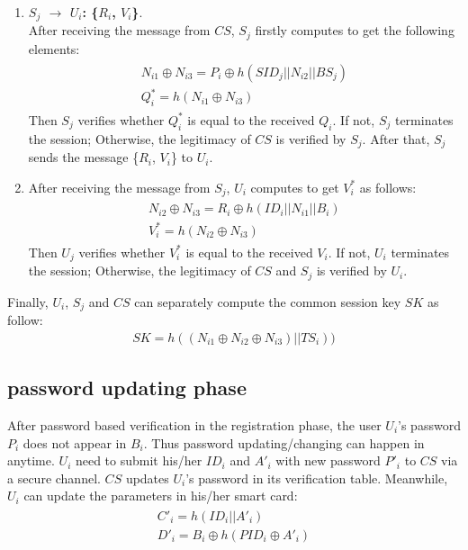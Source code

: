 \documentclass[preprint,12pt]{elsarticle}
\begin{document}
\begin{enumerate}[Step 1:]
\item \textbf{$S_j$ $\rightarrow$ $U_i$: \{$R_i$, $V_i$\}}.\\
After receiving the message from $CS$, $S_j$ firstly computes to get the following elements:
\begin{eqnarray}
\left.\begin{array}{l}
N_{i1}\oplus N_{i3}=P_i \oplus h(SID_j||N_{i2}||BS_j)\\
Q^*_i=h(N_{i1}\oplus N_{i3})
 \end{array} \right.
\end{eqnarray}
Then $S_j$ verifies whether $Q^*_i$ is equal to the received $Q_i$. If not, $S_j$ terminates the session; Otherwise, the legitimacy of $CS$ is verified by $S_j$. After that, $S_j$ sends the message \{$R_i$, $V_i$\} to $U_i$.

\item
After receiving the message from $S_j$, $U_i$ computes to get $V^*_i$ as follows:
\begin{eqnarray}
\left.\begin{array}{l}
N_{i2}\oplus N_{i3}=R_i \oplus h(ID_i||N_{i1}||B_i)\\
V^*_i=h(N_{i2}\oplus N_{i3})
 \end{array} \right.
\end{eqnarray}
Then $U_j$ verifies whether $V^*_i$ is equal to the received $V_i$. If not, $U_i$ terminates the session; Otherwise, the legitimacy of $CS$ and $S_j$ is verified by $U_i$.

\end{enumerate}

Finally, $U_i$, $S_j$ and $CS$ can separately compute the common session key $SK$ as follow:
\begin{eqnarray}
SK=h((N_{i1}\oplus N_{i2}\oplus N_{i3})|| TS_i))
\end{eqnarray}

\subsection{password updating phase}
After password based verification in the registration phase, the user $U_i$'s password $P_i$  does not appear in $B_i$. Thus password updating/changing can happen in anytime. $U_i$ need to submit his/her $ID_i$ and $A'_i$ with new password $P'_i$ to $CS$ via a secure channel. $CS$ updates $U_i$'s password in its verification table. Meanwhile, $U_i$ can update the parameters in his/her smart card:
\begin{eqnarray}
\left.\begin{array}{l}
C'_i=h(ID_i||A'_i)\\
D'_i=B_i\oplus h(PID_i\oplus A'_i)
 \end{array} \right.
\end{eqnarray}
\end{document}
